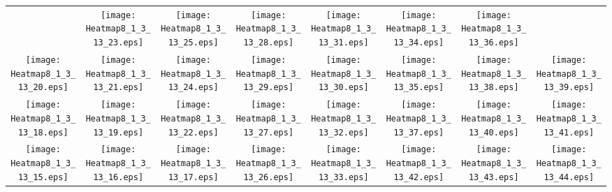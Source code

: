 \documentclass{standalone}
\begin{document}
\renewcommand{\arraystretch}{0}
\setlength{\tabcolsep}{0pt}
\begin{tabular}{ *8{c} }
 & \texttt{[image: Heatmap8\_1\_3\_13\_23.eps]} & \texttt{[image: Heatmap8\_1\_3\_13\_25.eps]} & \texttt{[image: Heatmap8\_1\_3\_13\_28.eps]} & \texttt{[image: Heatmap8\_1\_3\_13\_31.eps]} & \texttt{[image: Heatmap8\_1\_3\_13\_34.eps]} & \texttt{[image: Heatmap8\_1\_3\_13\_36.eps]} &  \\
\texttt{[image: Heatmap8\_1\_3\_13\_20.eps]} & \texttt{[image: Heatmap8\_1\_3\_13\_21.eps]} & \texttt{[image: Heatmap8\_1\_3\_13\_24.eps]} & \texttt{[image: Heatmap8\_1\_3\_13\_29.eps]} & \texttt{[image: Heatmap8\_1\_3\_13\_30.eps]} & \texttt{[image: Heatmap8\_1\_3\_13\_35.eps]} & \texttt{[image: Heatmap8\_1\_3\_13\_38.eps]} & \texttt{[image: Heatmap8\_1\_3\_13\_39.eps]} \\
\texttt{[image: Heatmap8\_1\_3\_13\_18.eps]} & \texttt{[image: Heatmap8\_1\_3\_13\_19.eps]} & \texttt{[image: Heatmap8\_1\_3\_13\_22.eps]} & \texttt{[image: Heatmap8\_1\_3\_13\_27.eps]} & \texttt{[image: Heatmap8\_1\_3\_13\_32.eps]} & \texttt{[image: Heatmap8\_1\_3\_13\_37.eps]} & \texttt{[image: Heatmap8\_1\_3\_13\_40.eps]} & \texttt{[image: Heatmap8\_1\_3\_13\_41.eps]} \\
\texttt{[image: Heatmap8\_1\_3\_13\_15.eps]} & \texttt{[image: Heatmap8\_1\_3\_13\_16.eps]} & \texttt{[image: Heatmap8\_1\_3\_13\_17.eps]} & \texttt{[image: Heatmap8\_1\_3\_13\_26.eps]} & \texttt{[image: Heatmap8\_1\_3\_13\_33.eps]} & \texttt{[image: Heatmap8\_1\_3\_13\_42.eps]} & \texttt{[image: Heatmap8\_1\_3\_13\_43.eps]} & \texttt{[image: Heatmap8\_1\_3\_13\_44.eps]} \\

\end{tabular}
\end{document}
